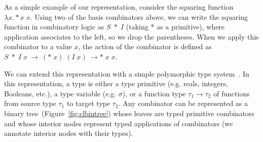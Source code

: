 \documentclass{article}
\begin{document}
As a simple example of our representation, consider the squaring
function $\lambda x. * x\; x $. Using two of the basis combinators
above, we can write the squaring function in combinatory logic as $S\; *\;
I$ (taking $*$ as a primitive), where application associates to the
left, so we drop the parentheses. When we apply this combinator to a
value $x$, the action of the combinator is defined as $S \;*\; I\;
x~\rightarrow~(*\; x)\; (I\; x)~\rightarrow *\; x \; x$.

We can extend this representation with a simple polymorphic type
system~\cite{Pierce_2002}. In this representation, a type is either a
type primitive (e.g. reals, integers, Booleans, etc.), a type variable
(e.g. $\sigma$), or a function type $ \tau_1 \rightarrow \tau_2$ of
functions from source type $\tau_1$ to target type $\tau_2$. Any combinator
can be represented as a binary tree~(Figure~\ref{fig:clbintree}) whose
leaves are typed primitive combinators and whose interior nodes
represent typed applications of combinators (we annotate interior
nodes with their types).
\end{document}
